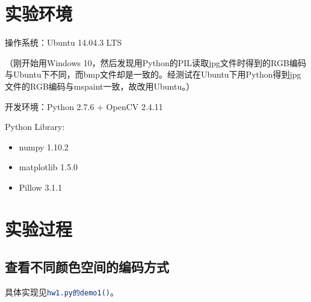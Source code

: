 \documentclass[a4paper, 12pt, UTF8]{article}
\begin{document}
\section{实验环境}

操作系统：Ubuntu 14.04.3 LTS

（刚开始用Windows 10，然后发现用Python的PIL读取jpg文件时得到的RGB编码与Ubuntu下不同，而bmp文件却是一致的。经测试在Ubuntu下用Python得到jpg文件的RGB编码与mspaint一致，故改用Ubuntu。）

开发环境：Python 2.7.6 + OpenCV 2.4.11

Python Library:

\begin{itemize}

\setlength{\itemsep}{0pt}

\item numpy 1.10.2

\item matplotlib 1.5.0

\item Pillow 3.1.1

\end{itemize}

\section{实验过程}

\subsection{查看不同颜色空间的编码方式}

具体实现见\lstinline[language=bash]{hw1.py的demo1()}。
\end{document}
